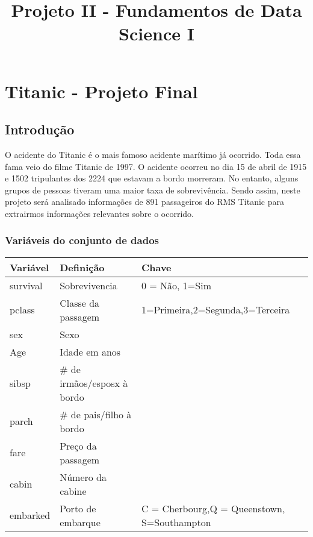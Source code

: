 \documentclass[11pt]{article}
\title{Projeto II - Fundamentos de Data Science I}
\begin{document}
    
    
    \maketitle
    
    

    
    \hypertarget{titanic---projeto-final}{%
\section{Titanic - Projeto Final}\label{titanic---projeto-final}}

\hypertarget{introduuxe7uxe3o}{%
\subsection{Introdução}\label{introduuxe7uxe3o}}

O acidente do Titanic é o mais famoso acidente marítimo já ocorrido.
Toda essa fama veio do filme Titanic de 1997. O acidente ocorreu no dia
15 de abril de 1915 e 1502 tripulantes dos 2224 que estavam a bordo
morreram. No entanto, alguns grupos de pessoas tiveram uma maior taxa de
sobrevivência. Sendo assim, neste projeto será analisado informações de
891 passageiros do RMS Titanic para extrairmos informações relevantes
sobre o ocorrido.

\hypertarget{variuxe1veis-do-conjunto-de-dados}{%
\subsubsection{Variáveis do conjunto de
dados}\label{variuxe1veis-do-conjunto-de-dados}}

\begin{longtable}[]{@{}lll@{}}
\toprule
Variável & Definição & Chave\tabularnewline
\midrule
\endhead
survival & Sobrevivencia & 0 = Não, 1=Sim\tabularnewline
pclass & Classe da passagem &
1=Primeira,2=Segunda,3=Terceira\tabularnewline
sex & Sexo &\tabularnewline
Age & Idade em anos &\tabularnewline
sibsp & \# de irmãos/esposx à bordo &\tabularnewline
parch & \# de pais/filho à bordo &\tabularnewline
fare & Preço da passagem &\tabularnewline
cabin & Número da cabine &\tabularnewline
embarked & Porto de embarque & C = Cherbourg,Q = Queenstown,
S=Southampton\tabularnewline
\bottomrule
\end{longtable}
\end{document}
